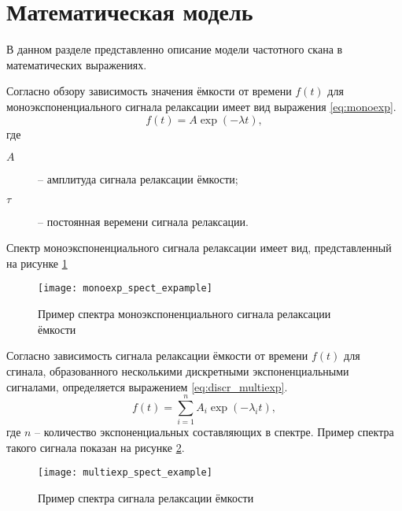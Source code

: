 \section{Математическая модель}

    В данном разделе представленно описание модели частотного скана 
    в математических выражениях.

    Согласно обзору \cite{istratov_exp_analysis} зависимость значения
    ёмкости от времени $f(t)$ для моноэкспоненциального сигнала релаксации
    имеет вид выражения \ref{eq:monoexp}.
    \begin{equation}
        \label{eq:monoexp}
        f(t) = A \exp \left(-\lambda t\right) ,
    \end{equation}
    где
    \begin{description}
        \item[\(A\)] -- амплитуда сигнала релаксации ёмкости;
        \item[\(\tau\)] -- постоянная веремени сигнала релаксации.
    \end{description}
    Спектр моноэкспоненциального сигнала релаксации имеет вид, 
    представленный на рисунке \ref{pic:monoexp_spect_example}
    \begin{figure}[ht]
        \centering
        \texttt{[image: monoexp\_spect\_expample]}
        \caption{Пример спектра моноэкспоненциального сигнала релаксации
        ёмкости}
        \label{pic:monoexp_spect_example}
    \end{figure}

    Согласно \cite{istratov_exp_analysis} зависимость сигнала релаксации
    ёмкости от времени $f(t)$ для сгинала, образованного несколькими
    дискретными экспоненциальными сигналами, определяется выражением 
    \ref{eq:discr_multiexp}.
    \begin{equation}
        \label{eq:discr_multiexp}
        f(t) = \sum_{i=1}^{n}A_i\exp\left(-\lambda_i t\right) ,
    \end{equation}
    где $n$ -- количество экспоненциальных составляющих в спектре.
    Пример спектра такого сигнала показан на рисунке 
    \ref{pic:multiexp_spect_example}.
    \begin{figure}[ht]
        \centering
        \texttt{[image: multiexp\_spect\_example]}
        \caption{Пример спектра сигнала релаксации ёмкости}
        \label{pic:multiexp_spect_example}
    \end{figure}